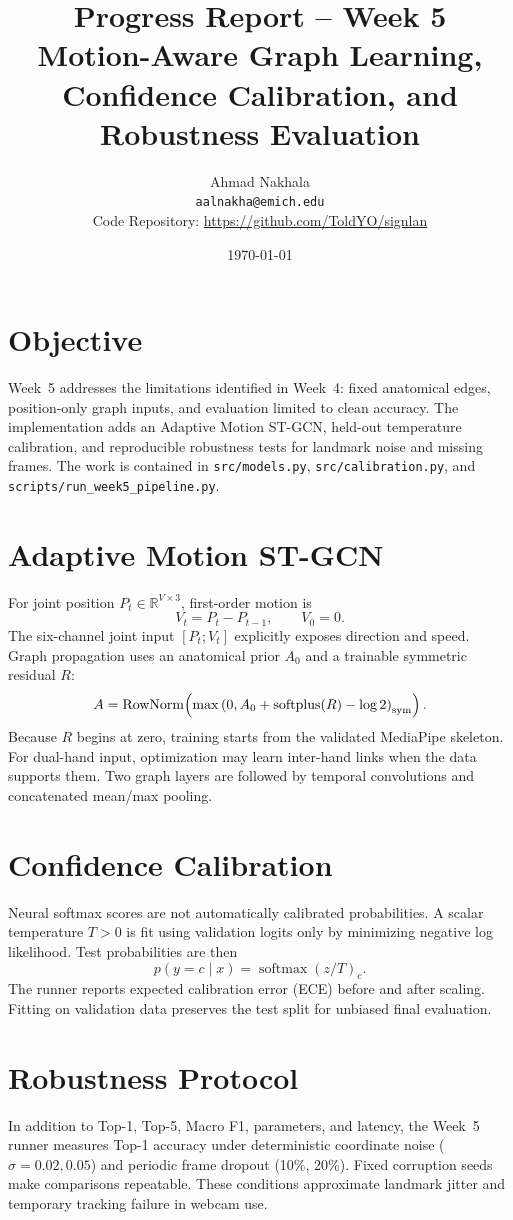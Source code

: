 \documentclass{article}
\title{Progress Report -- Week 5\\\large Motion-Aware Graph Learning, Confidence Calibration, and Robustness Evaluation}
\author{Ahmad Nakhala\\\texttt{aalnakha@emich.edu}\\\normalsize Code Repository: \url{https://github.com/ToldYO/signlan}}
\date{\today}
\begin{document}
\maketitle

\section*{Objective}
Week~5 addresses the limitations identified in Week~4: fixed anatomical edges, position-only graph inputs, and evaluation limited to clean accuracy. The implementation adds an Adaptive Motion ST-GCN, held-out temperature calibration, and reproducible robustness tests for landmark noise and missing frames. The work is contained in \texttt{src/models.py}, \texttt{src/calibration.py}, and \texttt{scripts/run\_week5\_pipeline.py}.

\section*{Adaptive Motion ST-GCN}
For joint position $P_t\in\mathbb{R}^{V\times3}$, first-order motion is
\[
V_t=P_t-P_{t-1},\qquad V_0=0.
\]
The six-channel joint input $[P_t;V_t]$ explicitly exposes direction and speed. Graph propagation uses an anatomical prior $A_0$ and a trainable symmetric residual $R$:
\[
A=\operatorname{RowNorm}\!\left(\max\left(0,A_0+\operatorname{softplus}(R)-\log2\right)_{\rm sym}\right).
\]
Because $R$ begins at zero, training starts from the validated MediaPipe skeleton. For dual-hand input, optimization may learn inter-hand links when the data supports them. Two graph layers are followed by temporal convolutions and concatenated mean/max pooling.

\section*{Confidence Calibration}
Neural softmax scores are not automatically calibrated probabilities. A scalar temperature $T>0$ is fit using validation logits only by minimizing negative log likelihood. Test probabilities are then
\[
p(y=c\mid x)=\operatorname{softmax}(z/T)_c.
\]
The runner reports expected calibration error (ECE) before and after scaling. Fitting on validation data preserves the test split for unbiased final evaluation.

\section*{Robustness Protocol}
In addition to Top-1, Top-5, Macro F1, parameters, and latency, the Week~5 runner measures Top-1 accuracy under deterministic coordinate noise ($\sigma=0.02,0.05$) and periodic frame dropout (10\%, 20\%). Fixed corruption seeds make comparisons repeatable. These conditions approximate landmark jitter and temporary tracking failure in webcam use.
\end{document}
